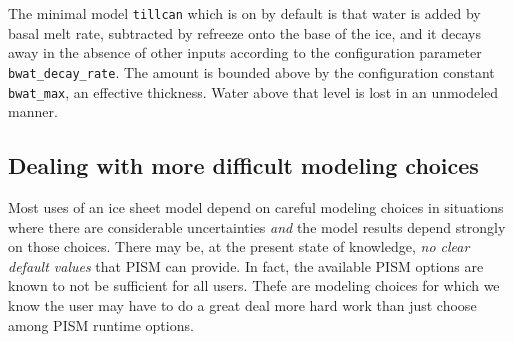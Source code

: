 The minimal model \verb|tillcan| which is on by default is that water is added by basal melt rate, subtracted by refreeze onto the base of the ice, and it decays away in the absence of other inputs according to the configuration parameter \texttt{bwat_decay_rate}.  The amount is bounded above by the configuration constant \texttt{bwat_max}, an effective thickness.  Water above that level is lost in an unmodeled manner.


\subsection{Dealing with more difficult modeling choices}
\label{subsec:hard-choices}

Most uses of an ice sheet model depend on careful modeling choices in situations where there are considerable uncertainties \emph{and} the model results depend strongly on those choices.  There may be, at the present state of knowledge, \emph{no clear default values} that PISM can provide.  In fact, the available PISM options are known to not be sufficient for all users.  Thefe are modeling choices for which we know the user may have to do a great deal more hard work than just choose among PISM runtime options.

